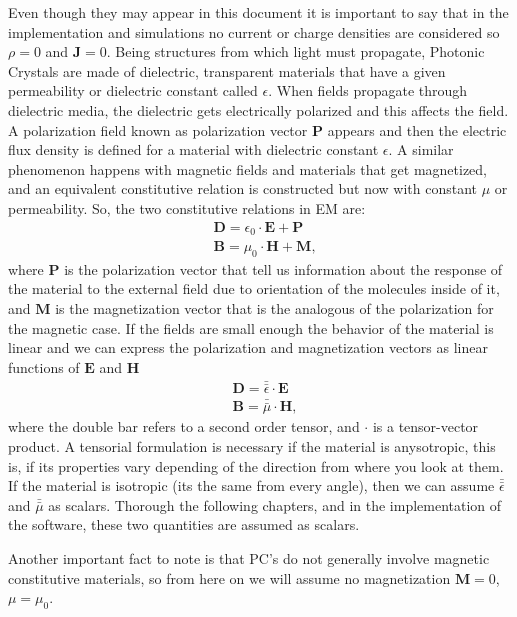 Even though they may appear in this document it is important to say that in the implementation and simulations no current or charge densities are considered so $\rho = 0$ and $\mathbf{J} =0$.
Being structures from which light must propagate, Photonic Crystals are made of dielectric, transparent  materials that have a given permeability or dielectric constant called $\epsilon$. When fields propagate through dielectric media, the dielectric gets electrically polarized and this affects the field. A polarization field known as polarization vector $\mathbf{P}$ appears and then the electric flux density is defined for a material with dielectric constant $\epsilon$.  A similar phenomenon happens with magnetic fields and materials that get magnetized, and an equivalent constitutive relation is constructed but now with constant $\mu$ or permeability.
So, the two constitutive relations in EM are:
\begin{align}
&\mathbf{D} = \epsilon_0 \cdot \mathbf{E} + \mathbf{P}\\
&\mathbf{B} = \mu_0 \cdot \mathbf{H} + \mathbf{M},
\end{align}
where $\mathbf{P}$ is the polarization vector that tell us information about the response of the material to the external field due to orientation of the molecules inside of it, and $\mathbf{M}$ is the magnetization vector that is the analogous of the polarization for the magnetic case. If the fields are small enough the behavior of the material is linear and we can express the polarization and magnetization vectors as linear functions of $\mathbf{E}$ and $\mathbf{H}$
\begin{align}
&\mathbf{D} = \bar{\bar{\epsilon}} \cdot \mathbf{E}\\
&\mathbf{B} = \bar{\bar{\mu}} \cdot \mathbf{H},
\end{align}
where the double bar refers to a second order tensor, and $\cdot$ is a tensor-vector product. A tensorial formulation is necessary if the material is anysotropic, this is, if its properties vary depending of the direction from where you look at them. If the material is isotropic (its the same from every angle), then we can assume $\bar{\bar{\epsilon}}$ and $\bar{\bar{\mu}}$ as scalars. Thorough the following chapters, and in the implementation of the software, these two quantities are assumed as scalars.

Another important fact to note is that PC's do not generally involve magnetic constitutive materials, so from here on we will assume no magnetization $\mathbf{M} = 0$, $\mu = \mu_0$. 

